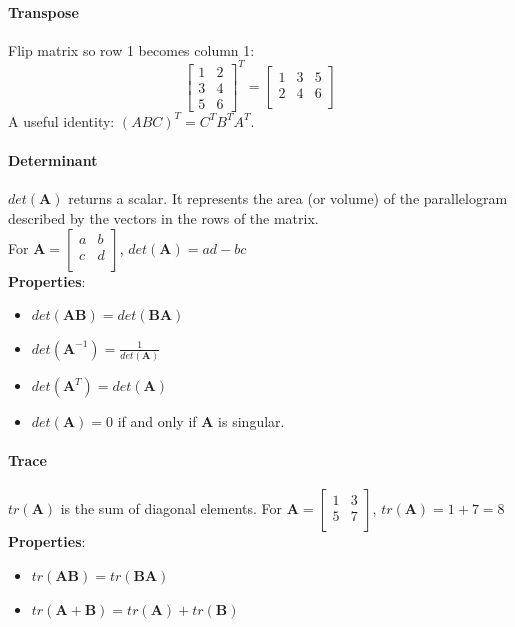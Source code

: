 \documentclass{article}
\begin{document}
\paragraph{Transpose} Flip matrix so row 1 becomes column 1:
\[
\begin{bmatrix}
    1 & 2 \\
    3 & 4 \\
    5 & 6
\end{bmatrix}^T
=
\begin{bmatrix}
    1 & 3 & 5\\
    2 & 4 & 6\\
\end{bmatrix}
\]
A useful identity: $(ABC)^T = C^TB^TA^T$.

\paragraph{Determinant} $det(\mathbf{A})$ returns a scalar. It represents the area (or volume) of the parallelogram described by the vectors in the rows of the matrix.\\
For $\mathbf{A} = \begin{bmatrix}
    a & b \\
    c & d \\
\end{bmatrix}$, $det(\mathbf{A}) = ad-bc$\\
\textbf{Properties}:
\begin{itemize}
	\item $det(\mathbf{AB}) = det(\mathbf{BA})$
    \item $det(\mathbf{A}^{-1}) = \frac{1}{det(\mathbf{A})}$
    \item $det(\mathbf{A}^T) = det(\mathbf{A})$
    \item $det(\mathbf{A}) = 0$ if and only if \textbf{A} is singular.
\end{itemize}

\paragraph{Trace} $tr(\mathbf{A})$ is the sum of diagonal elements.
For $\mathbf{A} = \begin{bmatrix}
    1 & 3 \\
    5 & 7 \\
\end{bmatrix}$, $tr(\mathbf{A}) = 1+7 = 8$\\
\textbf{Properties}:
\begin{itemize}
	\item $tr(\mathbf{AB}) = tr(\mathbf{BA})$
    \item $tr(\mathbf{A+B}) = tr(\mathbf{A}) + tr(\mathbf{B})$
\end{itemize}
\end{document}
